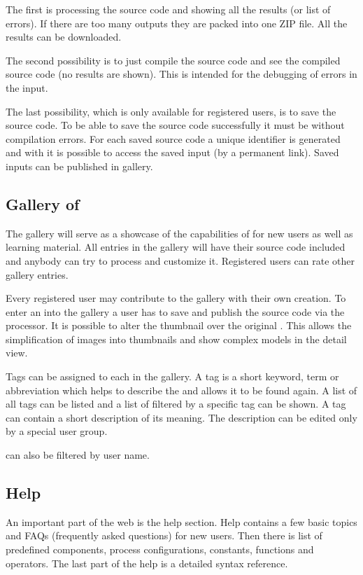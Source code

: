 The first is processing the source code and showing all the results (or list of errors).
If there are too many outputs they are packed into one ZIP file.
All the results can be downloaded.

The second possibility is to just compile the source code and see the compiled source code (no results are shown).
This is intended for the debugging of errors in the input.

The last possibility, which is only available for registered users, is to save the source code.
To be able to save the source code successfully it must be without compilation errors.
For each saved source code a unique identifier is generated and with it is possible to access the saved input (by a permanent link).
Saved inputs can be published in gallery.


\subsection{Gallery of \lsystems}

The gallery will serve as a showcase of the capabilities of \lsystems for new users as well as learning material.
All entries in the gallery will have their source code included and anybody can try to process and customize it.
Registered users can rate other gallery entries.

Every registered user may contribute to the gallery with their own creation.
To enter an \lsystem into the gallery a user has to save and publish the source code via the \lsystem processor.
It is possible to alter the thumbnail \lsystem over the original \lsystem.
This allows the simplification of images into thumbnails and show complex models in the detail view.

Tags can be assigned to each \lsystem in the gallery.
A tag is a short keyword, term or abbreviation which helps to describe the \lsystem and allows it to be found again.
A list of all tags can be listed and a list of \lsystems filtered by a specific tag can be shown.
A tag can contain a short description of its meaning.
The description can be edited only by a special user group.

\lsystems can also be filtered by user name.


\subsection{Help}

An important part of the web is the help section.
Help contains a few basic topics and FAQs (frequently asked questions) for new users.
Then there is list of predefined components, process configurations, constants, functions and operators.
The last part of the help is a detailed syntax reference.


